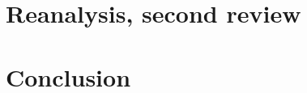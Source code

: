\documentclass[12pt]{memoir}
\begin{document}
\part[ Reanalysis, second review]{ Reanalysis, second review}

\newpage
\normalsize

\newpage
\normalsize
\part[Conclusion]{Conclusion}

\newpage
\normalsize
\renewcommand{\bibname}{Bibliography} 



\newpage
\normalsize
\end{document}
